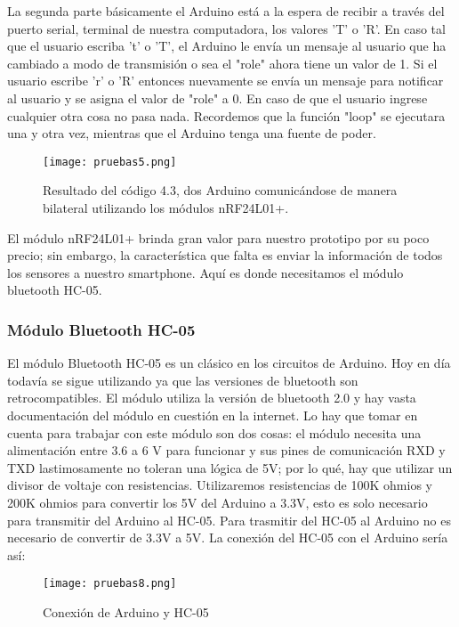 \par \noindent
La segunda parte básicamente el Arduino está a la espera de recibir a través del puerto serial, terminal de nuestra computadora, los valores 'T' o 'R'. En caso tal que el usuario escriba 't' o 'T', el Arduino le envía un mensaje al usuario que ha cambiado a modo de transmisión o sea el "role" ahora tiene un valor de 1. Si el usuario escribe 'r' o 'R' entonces nuevamente se envía un mensaje para notificar al usuario y se asigna el valor de "role" a 0. En caso de que el usuario ingrese cualquier otra cosa no pasa nada. Recordemos que la función "loop" se ejecutara una y otra vez, mientras que el Arduino tenga una fuente de poder.

\begin{figure}[H]
	\centering
	\texttt{[image: pruebas5.png]}
	\caption{Resultado del código 4.3, dos Arduino comunicándose de manera bilateral utilizando los módulos nRF24L01+.}
\end{figure}

\par \noindent
El módulo nRF24L01+ brinda gran valor para nuestro prototipo por su poco precio; sin embargo, la característica que falta es enviar la información de todos los sensores a nuestro smartphone. Aquí es donde necesitamos el módulo bluetooth HC-05.  

\subsubsection{Módulo Bluetooth HC-05}
\par
El módulo Bluetooth HC-05 es un clásico en los circuitos de Arduino. Hoy en día todavía se sigue utilizando ya que las versiones de bluetooth son retrocompatibles. El módulo utiliza la versión de bluetooth 2.0 y hay vasta documentación del módulo en cuestión en la internet. Lo hay que tomar en cuenta para trabajar con este módulo son dos cosas: el módulo necesita una alimentación entre 3.6 a 6 V para funcionar y sus pines de comunicación RXD y TXD lastimosamente no toleran una lógica de 5V; por lo qué, hay que utilizar un divisor de voltaje con resistencias. Utilizaremos resistencias de 100K ohmios y 200K ohmios para convertir los 5V del Arduino a 3.3V, esto es solo necesario para transmitir del Arduino al HC-05. Para trasmitir del HC-05 al Arduino no es necesario de convertir de 3.3V a 5V. La conexión del HC-05 con el Arduino sería así:

\begin{figure}[H]
	\centering
	\texttt{[image: pruebas8.png]}
	\caption{Conexión de Arduino y HC-05}
\end{figure} 

